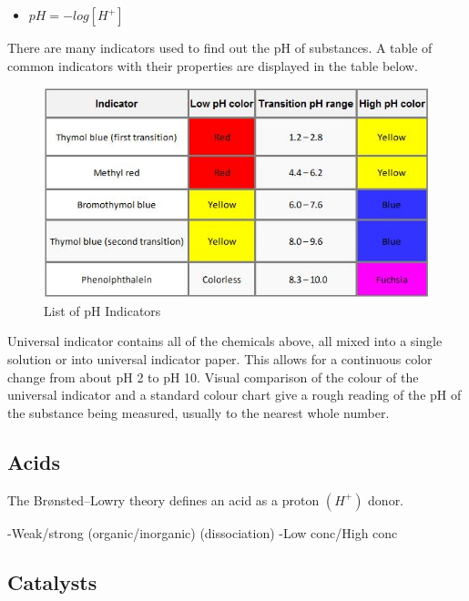 \begin{itemize}
\item $pH = - log [H^+]$
\end{itemize}

There are many indicators used to find out the pH of substances. A table of common indicators with their properties are displayed in the table below.

\begin{figure}[H]
    \includegraphics[width=\textwidth]{./Planning/Images/Indicators.jpg}
    \caption{List of pH Indicators} \label{fig:pH Indicators}
\end{figure}

Universal indicator contains all of the chemicals above, all mixed into a single solution or into universal indicator paper. This allows for a continuous color change from about pH 2 to pH 10. Visual comparison of the colour of the universal indicator and a standard colour chart give a rough reading of the pH of the substance being measured, usually to the nearest whole number. 


	\subsection{Acids}

The Brønsted–Lowry theory defines an acid as a proton $(H^+)$ donor. 

-Weak/strong (organic/inorganic) (dissociation)
-Low conc/High conc



	\subsection{Catalysts}








